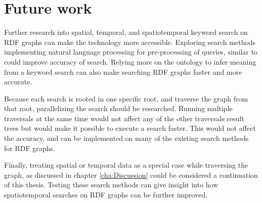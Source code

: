 \section{Future work}
\label{sec:futureWork}
Further research into spatial, temporal, and spatiotemporal keyword search on RDF graphs can make the technology more accessible. Exploring search methods implementing natural language processing for pre-processing of queries, similar to \cite{aqualog} could improve accuracy of search. Relying more on the ontology to infer meaning from a keyword search can also make searching RDF graphs faster and more accurate.

Because each search is rooted in one specific root, and traverse the graph from that root, parallelizing the search should be researched. Running multiple traversals at the same time would not affect any of the other traversals result trees but would make it possible to execute a search faster. This would not affect the accuracy, and can be implemented on many of the existing search methods for RDF graphs.

Finally, treating spatial or temporal data as a special case while traversing the graph, as discussed in chapter \ref{cha:Discussion} could be considered a continuation of this thesis. Testing these search methods can give insight into how spatiotemporal searches on RDF graphs can be further improved.